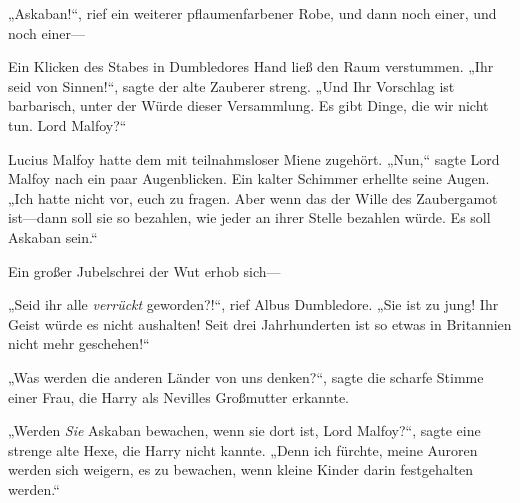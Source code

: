 „Askaban!“, rief ein weiterer pflaumenfarbener Robe, und dann noch einer, und noch einer—

Ein Klicken des Stabes in Dumbledores Hand ließ den Raum verstummen. „Ihr seid von Sinnen!“, sagte der alte Zauberer streng. „Und Ihr Vorschlag ist barbarisch, unter der Würde dieser Versammlung. Es gibt Dinge, die wir nicht tun. Lord Malfoy?“

Lucius Malfoy hatte dem mit teilnahmsloser Miene zugehört.
„Nun,“ sagte Lord Malfoy nach ein paar Augenblicken. Ein kalter Schimmer erhellte seine Augen. „Ich hatte nicht vor, euch zu fragen. Aber wenn das der Wille des Zaubergamot ist—dann soll sie so bezahlen, wie jeder an ihrer Stelle bezahlen würde. Es soll Askaban sein.“

Ein großer Jubelschrei der Wut erhob sich—

„Seid ihr alle \emph{verrückt} geworden?!“, rief Albus Dumbledore. „Sie ist zu jung! Ihr Geist würde es nicht aushalten! Seit drei Jahrhunderten ist so etwas in Britannien nicht mehr geschehen!“

„Was werden die anderen Länder von uns denken?“, sagte die scharfe Stimme einer Frau, die Harry als Nevilles Großmutter erkannte.

„Werden \emph{Sie} Askaban bewachen, wenn sie dort ist, Lord Malfoy?“, sagte eine strenge alte Hexe, die Harry nicht kannte. „Denn ich fürchte, meine Auroren werden sich weigern, es zu bewachen, wenn kleine Kinder darin festgehalten werden.“

